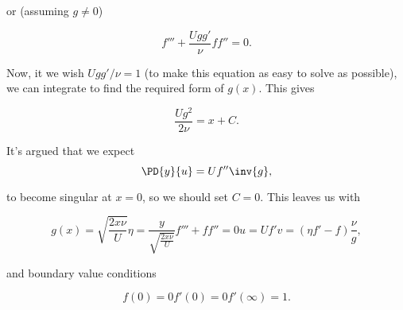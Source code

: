 or (assuming $g \ne 0$)

\begin{equation}\label{eqn:continuumL19:910}
f''' + \frac{U g g' }{\nu} f f'' = 0.
\end{equation}

Now, it we wish $U g g'/\nu = 1$ (to make this equation as easy to solve as possible), we can integrate to find the required form of $g(x)$.  This gives

\begin{equation}\label{eqn:continuumL19:930}
\frac{U g^2 }{2 \nu} = x + C.
\end{equation}

It's argued that we expect 
\begin{equation}\label{eqn:continuumL19:950}
\PD{y}{u} = U f'' \inv{g},
\end{equation}

to become singular at $x = 0$, so we should set $C = 0$.  This leaves us with

\begin{subequations}
\begin{equation}\label{eqn:continuumL19:970}
g(x) = \sqrt{\frac{2 x \nu}{U}}
\end{equation}
\begin{equation}\label{eqn:continuumL19:990}
\eta = \frac{y}{\sqrt{\frac{2 x \nu}{U}}}
\end{equation}
\begin{equation}\label{eqn:continuumL19:1010}
f''' + f f'' = 0
\end{equation}
\begin{equation}\label{eqn:continuumL19:1030}
u = U f'
\end{equation}
\begin{equation}\label{eqn:continuumL19:1050}
v = (\eta f' - f) \frac{\nu}{g},
\end{equation}
\end{subequations}

and boundary value conditions

\begin{subequations}
\begin{equation}\label{eqn:continuumL19:1070}
f(0) = 0
\end{equation}
\begin{equation}\label{eqn:continuumL19:1090}
f'(0) = 0
\end{equation}
\begin{equation}\label{eqn:continuumL19:1110}
f'(\infty) = 1.
\end{equation}
\end{subequations}

